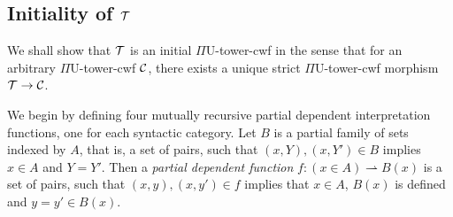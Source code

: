 \documentclass{lmcs}
\def\UU{\mathrm{U}}
\begin{document}
\subsection{Initiality of ${\mathcal T}$}
\label{sec:freenessT}

We shall show that ${\mathcal T}$ is an initial $\Pi\UU$-tower-cwf in the sense that for an arbitrary $\Pi\UU$-tower-cwf ${\mathcal C}$, there exists a unique strict $\Pi\UU$-tower-cwf morphism ${\mathcal T}  \rightarrow  {\mathcal C}$. 

We begin by defining four mutually recursive partial dependent interpretation functions, one for each syntactic category. Let $B$ is a partial family of sets indexed by $A$, that is, a set of pairs, such that $(x,Y), (x,Y') \in B$ implies $x \in A$ and $Y=Y'$. Then a {\em partial dependent function} $f :  (x \in A) \rightharpoonup B(x)$  is a set of pairs, such that $(x,y), (x,y') \in f$ implies that $x \in A$, $B(x)$ is defined and $y = y' \in B(x)$.
\end{document}

